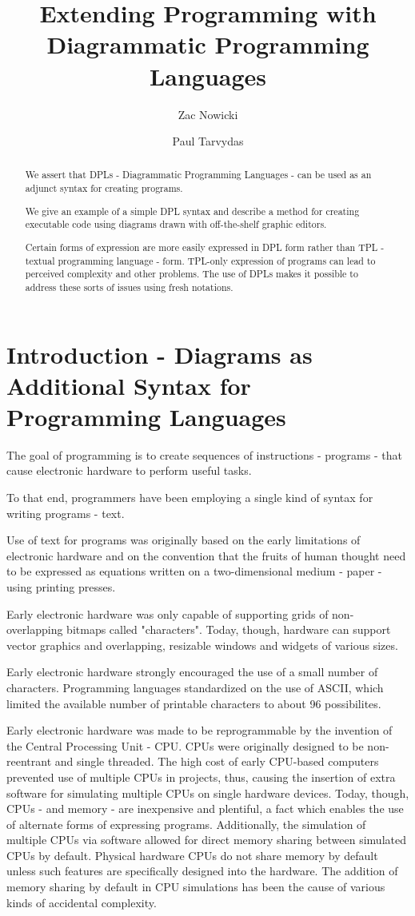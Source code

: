 \documentclass[10pt,anonymous,review]{acmart}
\title{Extending Programming with Diagrammatic Programming Languages}
\author{Zac Nowicki}
\affiliation{
  \institution{Kagi Inc.}
  \city{Palo Alto}
  \state{CA}
  \country{USA}
}
\author{Paul Tarvydas}
\affiliation{
  \institution{Retired}
  \city{Toronto}
  \state{Ontario}
  \country{Canada}
}
\begin{document}
\begin{abstract}

We assert that DPLs - Diagrammatic Programming Languages - can be used as an adjunct syntax for creating programs.

We give an example of a simple DPL syntax and describe a method for creating executable code using diagrams drawn with off-the-shelf graphic editors.
  
Certain forms of expression are more easily expressed in DPL form rather than TPL - textual programming language - form. TPL-only expression of programs can lead to perceived complexity and other problems. The use of DPLs makes it possible to address these sorts of issues using fresh notations.
\end{abstract}

\maketitle

\section{Introduction - Diagrams as Additional Syntax for Programming Languages}
The goal of programming is to create sequences of instructions -
programs - that cause electronic hardware to perform useful tasks.

To that end, programmers have been employing a single kind of syntax for writing programs -
text.

Use of text for programs was originally based on the early limitations of
electronic hardware and on the convention that the fruits of human thought need to be
expressed as equations written on a two-dimensional medium - paper -
using printing presses.

Early electronic hardware was only capable of supporting grids of
non-overlapping bitmaps called "characters". Today, though, hardware can
support vector graphics and overlapping, resizable windows and widgets of various sizes.

Early electronic hardware strongly encouraged the use of a small number of characters. Programming languages standardized on the use of ASCII, which limited the available number of printable characters to about 96 possibilites.

Early electronic hardware was made to be reprogrammable by the invention of
the Central Processing Unit - CPU. CPUs were originally designed to be
non-reentrant and single threaded. The high cost of early CPU-based
computers prevented use of multiple CPUs in projects, thus, causing the
insertion of extra software for simulating multiple CPUs on single
hardware devices. Today, though, CPUs - and memory - are inexpensive and
plentiful, a fact which enables the use of alternate forms of
expressing programs. Additionally, the simulation of multiple CPUs via software 
allowed for direct memory sharing between simulated CPUs by default. Physical 
hardware CPUs do not share memory by default unless such features are specifically 
designed into the hardware. The addition of memory sharing by default in CPU simulations
has been the cause of various kinds of accidental complexity.
\end{document}
